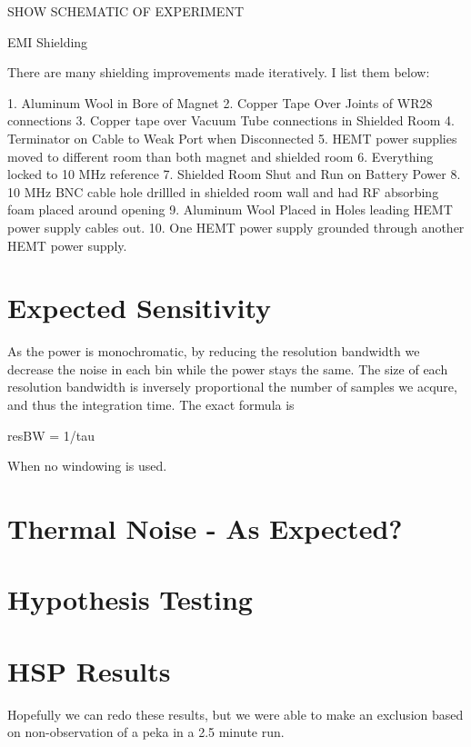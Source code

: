 \documentclass[11pt]{article}
\begin{document}
SHOW SCHEMATIC OF EXPERIMENT

EMI Shielding

There are many shielding improvements made iteratively. I list them below:

1. Aluminum Wool in Bore of Magnet
2. Copper Tape Over Joints of WR28 connections
3. Copper tape over Vacuum Tube connections in Shielded Room
4. Terminator on Cable to Weak Port when Disconnected
5. HEMT power supplies moved to different room than both magnet and shielded room
6. Everything locked to 10 MHz reference
7. Shielded Room Shut and Run on Battery Power
8. 10 MHz BNC cable hole drillled in shielded room wall and had RF absorbing foam placed around opening
9. Aluminum Wool Placed in Holes leading HEMT power supply cables out.
10. One HEMT power supply grounded through another HEMT power supply.

\section{Expected Sensitivity}

As the power is monochromatic, by reducing the resolution bandwidth we decrease the noise in each bin while the power stays the same. The size of each resolution bandwidth is inversely proportional the number of samples we acqure, and thus the integration time. The exact formula is 

resBW = 1/tau

When no windowing is used.

\section{Thermal Noise - As Expected?}

\section{Hypothesis Testing}

\section{HSP Results}

Hopefully we can redo these results, but we were able to make an exclusion based on non-observation of a peka in a 2.5 minute run.
\end{document}
